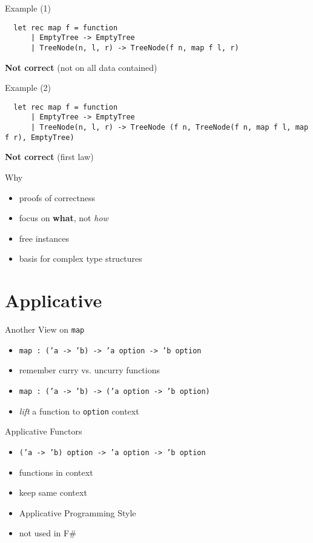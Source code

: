 \documentclass{beamer}
\begin{document}
\begin{frame}[fragile]{Example (1)}
  \small
  \begin{verbatim}
  let rec map f = function
      | EmptyTree -> EmptyTree
      | TreeNode(n, l, r) -> TreeNode(f n, map f l, r)
  \end{verbatim}
  \pause
  \textbf{Not correct} (not on all data contained)
\end{frame}

\begin{frame}[fragile]{Example (2)}
  \tiny
  \begin{verbatim}
  let rec map f = function
      | EmptyTree -> EmptyTree
      | TreeNode(n, l, r) -> TreeNode (f n, TreeNode(f n, map f l, map f r), EmptyTree)
  \end{verbatim}
  \pause
  \textbf{Not correct} (first law)
\end{frame}

\begin{frame}{Why}
  \begin{itemize}[<+->]
    \item proofs of correctness
    \item focus on \textbf{what}, not \textit{how}
    \item free instances
    \item basis for complex type structures
  \end{itemize}
\end{frame}

\section{Applicative}
\frame{\tableofcontents[currentsection]}

\begin{frame}{Another View on \texttt{map}}
    \begin{itemize}[<+->]
      \item \texttt{map : ('a -> 'b) -> 'a option -> 'b option}
      \item remember curry vs. uncurry functions
      \item \texttt{map : ('a -> 'b) -> ('a option -> 'b option)}
      \item \textit{lift} a function to \texttt{option} context
    \end{itemize}
\end{frame}

\begin{frame}{Applicative Functors}
  \begin{itemize}[<+->]
    \item \texttt{('a -> 'b) option -> 'a option -> 'b option}
    \item functions in context
    \item keep same context
    \item Applicative Programming Style
    \item not used in F\#
  \end{itemize}
\end{frame}
\end{document}
